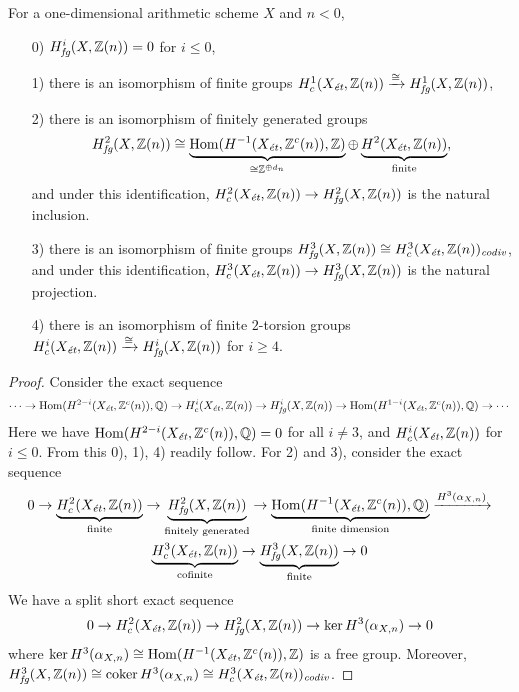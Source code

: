 \documentclass{article}
\numberwithin{equation}{section}
\begin{document}
\begin{proposition}
  \label{prop:calculation-of-H-fg}
  For a one-dimensional arithmetic scheme $X$ and $n < 0$,

  \begin{enumerate}
  \item[0)] $H^i_\fg (X, \ZZ(n)) = 0$ for $i \le 0$,

  \item[1)] there is an isomorphism of finite groups
    $H^1_c (X_\et, \ZZ(n)) \xrightarrow{\cong} H^1_\fg (X, \ZZ(n))$,

  \item[2)] there is an isomorphism of finitely generated groups
    \[ H^2_\fg (X, \ZZ(n)) \cong
      \underbrace{\Hom (H^{-1} (X_\et, \ZZ^c(n)), \ZZ)}_{\cong \ZZ^{\oplus d_n}}
      \oplus
      \underbrace{H^2 (X_\et, \ZZ(n))}_{\text{finite}}, \]
    and under this identification,
    $H^2_c (X_\et, \ZZ(n)) \to H^2_\fg (X, \ZZ(n))$ is the natural inclusion.

  \item[3)] there is an isomorphism of finite groups
    $H^3_\fg (X, \ZZ(n)) \cong H^3_c (X_\et, \ZZ(n))_\codiv$,
    and under this identification,
    $H^3_c (X_\et, \ZZ(n)) \to H^3_\fg (X, \ZZ(n))$ is the natural projection.

  \item[4)] there is an isomorphism of finite $2$-torsion groups
    $H^i_c (X_\et, \ZZ(n)) \xrightarrow{\cong} H^i_\fg (X, \ZZ(n))$
    for $i \ge 4$.
  \end{enumerate}

  \begin{proof}
    Consider the exact sequence
    \[ \cdots \to \Hom (H^{2-i} (X_\et, \ZZ^c (n)), \QQ) \to
      H^i_c (X_\et, \ZZ(n)) \to
      H^i_\fg (X, \ZZ(n)) \to
      \Hom (H^{1-i} (X_\et, \ZZ^c (n)), \QQ) \to \cdots \]
    Here we have $\Hom (H^{2-i} (X_\et, \ZZ^c (n)), \QQ) = 0$ for all
    $i \ne 3$, and $H^i_c (X_\et, \ZZ(n))$ for $i \le 0$. From this 0), 1), 4)
    readily follow. For 2) and 3), consider the exact sequence
    \begin{multline*}
      0 \to \underbrace{H^2_c (X_\et, \ZZ(n))}_{\text{finite}} \to
      \underbrace{H^2_\fg (X, \ZZ(n))}_{\text{finitely generated}} \to
      \underbrace{\Hom (H^{-1} (X_\et, \ZZ^c (n)), \QQ)}_{\text{finite dimension}} \xrightarrow{H^3 (\alpha_{X,n})} \\
      \underbrace{H^3_c (X_\et, \ZZ(n))}_{\text{cofinite}} \to
      \underbrace{H^3_\fg (X, \ZZ(n))}_{\text{finite}} \to 0
    \end{multline*}
    We have a split short exact sequence
    \[ 0 \to H^2_c (X_\et, \ZZ(n)) \to
      H^2_\fg (X, \ZZ(n)) \to
      \ker H^3 (\alpha_{X,n}) \to 0 \]
    where
    $\ker H^3 (\alpha_{X,n}) \cong \Hom (H^{-1} (X_\et, \ZZ^c(n)), \ZZ)$
    is a free group. Moreover,
    $H^3_\fg (X, \ZZ(n)) \cong \coker H^3 (\alpha_{X,n}) \cong
    H^3_c (X_\et, \ZZ(n))_\codiv$.
  \end{proof}
\end{proposition}
\end{document}
